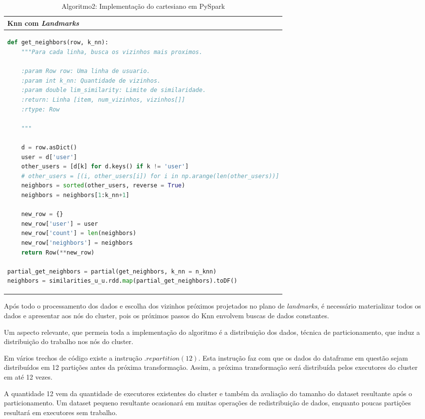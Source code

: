 \documentclass[12pt]{article}
\begin{document}
\begin{table}[ht]
	\begin{tabular}{l}
		Knn com \textit{Landmarks} \\ \hline
\begin{lstlisting}[language=Python]
def get_neighbors(row, k_nn):
	"""Para cada linha, busca os vizinhos mais proximos.
	
	:param Row row: Uma linha de usuario.
	:param int k_nn: Quantidade de vizinhos.
	:param double lim_similarity: Limite de similaridade.
	:return: Linha [item, num_vizinhos, vizinhos[]]
	:rtype: Row
	
	"""
	
	d = row.asDict()
	user = d['user']
	other_users = [d[k] for d.keys() if k != 'user']
	# other_users = [(i, other_users[i]) for i in np.arange(len(other_users))]
	neighbors = sorted(other_users, reverse = True)
	neighbors = neighbors[1:k_nn+1]
	
	new_row = {}
	new_row['user'] = user
	new_row['count'] = len(neighbors)
	new_row['neighbors'] = neighbors
	return Row(**new_row)
	
partial_get_neighbors = partial(get_neighbors, k_nn = n_knn)
neighbors = similarities_u_u.rdd.map(partial_get_neighbors).toDF()
\end{lstlisting}	
	\end{tabular}
	\caption{Algoritmo2: Implementação do cartesiano em PySpark}
	\label{tab:code1}
\end{table}

Após todo o processamento dos dados e escolha dos vizinhos próximos projetados no plano de \textit{landmarks}, é necessário materializar todos os dados e apresentar aos nós do cluster, pois os próximos passos do Knn envolvem buscas de dados constantes.

Um aspecto relevante, que permeia toda a implementação do algoritmo é a distribuição dos dados, técnica de particionamento, que induz a distribuição do trabalho nos nós do cluster. 

Em vários trechos de código existe a instrução $.repartition(12)$. Esta instrução faz com que os dados do dataframe em questão sejam distribuídos em 12 partições antes da próxima transformação. Assim, a próxima transformação será distribuída pelos executores do cluster em até 12 vezes.

A quantidade 12 vem da quantidade de executores existentes do cluster e também da avaliação do tamanho do dataset resultante após o particionamento. Um dataset pequeno resultante ocasionará em muitas operações de redistribuição de dados, enquanto poucas partições resultará em executores sem trabalho.
\end{document}
